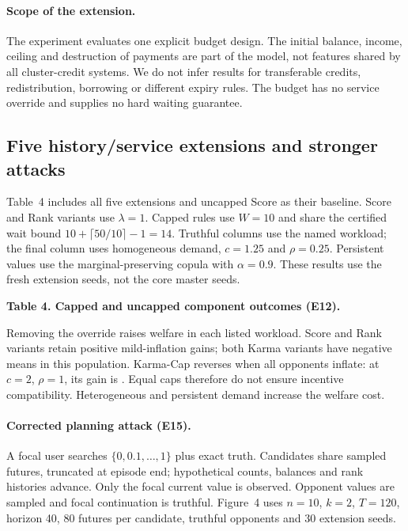 \documentclass{article}
\newcommand{\resulttable}[1]{\begin{center}\small\setlength{\tabcolsep}{5pt}\end{center}}
\begin{document}
\paragraph{Scope of the extension.}
The experiment evaluates one explicit budget design. The initial balance,
income, ceiling and destruction of payments are part of the model, not
features shared by all cluster-credit systems. We do not infer results for
transferable credits, redistribution, borrowing or different expiry rules.
The budget has no service override and supplies no hard waiting guarantee.

\newpage
\subsection{Five history/service extensions and stronger attacks}
Table~4 includes all five extensions and uncapped Score as their baseline.
Score and Rank variants use $\lambda=1$. Capped rules use $W=10$ and share the certified wait bound
$10+\lceil50/10\rceil-1=14$. Truthful columns use the named workload;
the final column uses homogeneous demand, $c=1.25$ and $\rho=0.25$.
Persistent values use the marginal-preserving copula with $\alpha=0.9$.
These results use the fresh extension seeds, not the core master seeds.

\begin{center}\small\textbf{Table 4. Capped and uncapped component outcomes (E12).}\end{center}
\resulttable{extensions}

Removing the override raises welfare in each listed workload. Score and Rank
variants retain positive mild-inflation gains; both Karma variants have negative
means in this population. Karma-Cap reverses when all opponents inflate:
at $c=2$, $\rho=1$, its gain is \KarmaPopulationReversal{}.
Equal caps therefore do not ensure incentive compatibility. Heterogeneous
and persistent demand increase the welfare cost.

\paragraph{Corrected planning attack (E15).}
A focal user searches $\{0,0.1,\ldots,1\}$ plus exact truth. Candidates share
sampled futures, truncated at episode end; hypothetical counts, balances and
rank histories advance. Only the focal current value is observed. Opponent
values are sampled and focal continuation is truthful. Figure~4 uses $n=10$,
$k=2$, $T=120$, horizon 40, 80 futures per candidate, truthful opponents and
30 extension seeds.
\end{document}
